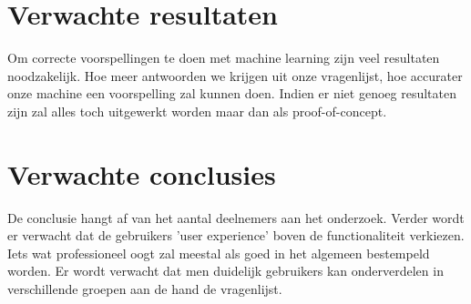 \section{Verwachte resultaten}
\label{sec:verwachte_resultaten}
Om correcte voorspellingen te doen met machine learning zijn veel resultaten noodzakelijk. Hoe meer antwoorden we krijgen uit onze vragenlijst, hoe accurater onze machine een voorspelling zal kunnen doen. Indien er niet genoeg resultaten zijn zal alles toch uitgewerkt worden maar dan als proof-of-concept.
\hfill \break \break


\section{Verwachte conclusies}
\label{sec:verwachte_conclusies}
De conclusie hangt af van het aantal deelnemers aan het onderzoek. Verder wordt er verwacht dat de gebruikers 'user experience' boven de functionaliteit verkiezen. Iets wat professioneel oogt zal meestal als goed in het algemeen bestempeld worden. Er wordt verwacht dat men duidelijk gebruikers kan onderverdelen in verschillende groepen aan de hand de vragenlijst. \hfill \break \break 

